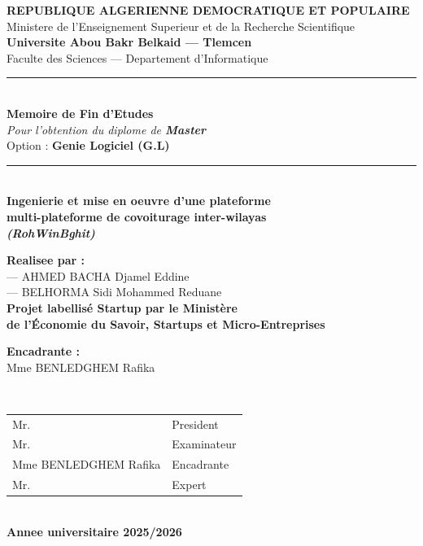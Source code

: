 \documentclass[12pt, a4paper, oneside]{report}
\begin{document}

\begin{titlepage}
\centering
{\large \textbf{REPUBLIQUE ALGERIENNE DEMOCRATIQUE ET POPULAIRE}}\\[3pt]
{\small Ministere de l'Enseignement Superieur et de la Recherche Scientifique}\\[6pt]
{\large \textbf{Universite Abou Bakr Belkaid --- Tlemcen}}\\
{\normalsize Faculte des Sciences --- Departement d'Informatique}\\[1.5em]
\rule{\textwidth}{1.5pt}\\[0.8em]
{\LARGE \textbf{Memoire de Fin d'Etudes}}\\[4pt]
{\large \emph{Pour l'obtention du diplome de \textbf{Master}}}\\
{\large Option : \textbf{Genie Logiciel (G.L)}}\\[0.8em]
\rule{\textwidth}{1.5pt}\\[1.8em]
{\huge \textbf{Ingenierie et mise en oeuvre d'une plateforme}}\\[4pt]
{\huge \textbf{multi-plateforme de covoiturage inter-wilayas}}\\[8pt]
{\LARGE \textit{\textbf{(RohWinBghit)}}}\\[2.5em]
\begin{minipage}{0.48\textwidth}
\raggedright
\textbf{Realisee par :}\\[1pt]
\quad --- AHMED BACHA Djamel Eddine\\
\quad --- BELHORMA Sidi Mohammed Reduane\\[1.5em]
\textcolor{blue!70!black}{\textbf{Projet labellisé Startup par le Ministère}}\\
\textcolor{blue!70!black}{\textbf{de l'Économie du Savoir, Startups et Micro-Entreprises}}
\end{minipage}
\hfill
\begin{minipage}{0.48\textwidth}
\raggedleft
\textbf{Encadrante :}\\[1pt]
Mme BENLEDGHEM Rafika
\end{minipage}\\[3em]
\begin{tabular}{ll}
Mr. \underline{\hspace{7cm}} & President \\[4pt]
Mr. \underline{\hspace{7cm}} & Examinateur \\[4pt]
Mme BENLEDGHEM Rafika & Encadrante \\[4pt]
Mr. \underline{\hspace{7cm}} & Expert \\
\end{tabular}\\[2.5em]
{\large \textbf{Annee universitaire 2025/2026}}
\end{titlepage}
\end{document}
